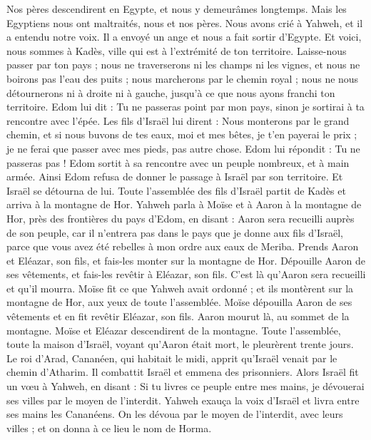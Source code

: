 \begin{multicols}{2}
Nos pères descendirent en Egypte, et nous y demeurâmes longtemps. Mais les Egyptiens nous ont maltraités, nous et nos pères.
Nous avons crié à Yahweh, et il a entendu notre voix. Il a envoyé un ange et nous a fait sortir d'Egypte. Et voici, nous sommes à Kadès, ville qui est à l’extrémité de ton territoire.
Laisse-nous passer par ton pays ; nous ne traverserons ni les champs ni les vignes, et nous ne boirons pas l'eau des puits ; nous marcherons par le chemin royal ; nous ne nous détournerons ni à droite ni à gauche, jusqu'à ce que nous ayons franchi ton territoire.
Edom lui dit : Tu ne passeras point par mon pays, sinon je sortirai à ta rencontre avec l’épée.
Les fils d'Israël lui dirent : Nous monterons par le grand chemin, et si nous buvons de tes eaux, moi et mes bêtes, je t'en payerai le prix ; je ne ferai que passer avec mes pieds, pas autre chose.
Edom lui répondit : Tu ne passeras pas ! Edom sortit à sa rencontre avec un peuple nombreux, et à main armée.
Ainsi Edom refusa de donner le passage à Israël par son territoire. Et Israël se détourna de lui.
Toute l’assemblée des fils d'Israël partit de Kadès et arriva à la montagne de Hor.
Yahweh parla à Moïse et à Aaron à la montagne de Hor, près des frontières du pays d'Edom, en disant :
Aaron sera recueilli auprès de son peuple, car il n'entrera pas dans le pays que je donne aux fils d'Israël, parce que vous avez été rebelles à mon ordre aux eaux de Meriba.
Prends Aaron et Eléazar, son fils, et fais-les monter sur la montagne de Hor.
Dépouille Aaron de ses vêtements, et fais-les revêtir à Eléazar, son fils. C’est là qu’Aaron sera recueilli et qu’il mourra.
Moïse fit ce que Yahweh avait ordonné ; et ils montèrent sur la montagne de Hor, aux yeux de toute l'assemblée.
Moïse dépouilla Aaron de ses vêtements et en fit revêtir Eléazar, son fils. Aaron mourut là, au sommet de la montagne. Moïse et Eléazar descendirent de la montagne.
Toute l'assemblée, toute la maison d'Israël, voyant qu'Aaron était mort, le pleurèrent trente jours.
\VerseOne{}Le roi d’Arad, Cananéen, qui habitait le midi, apprit qu'Israël venait par le chemin d’Atharim. Il combattit Israël et emmena des prisonniers.
Alors Israël fit un vœu à Yahweh, en disant : Si tu livres ce peuple entre mes mains, je dévouerai ses villes par le moyen de l'interdit.
Yahweh exauça la voix d'Israël et livra entre ses mains les Cananéens. On les dévoua par le moyen de l’interdit, avec leurs villes ; et on donna à ce lieu le nom de Horma.

\end{multicols}
